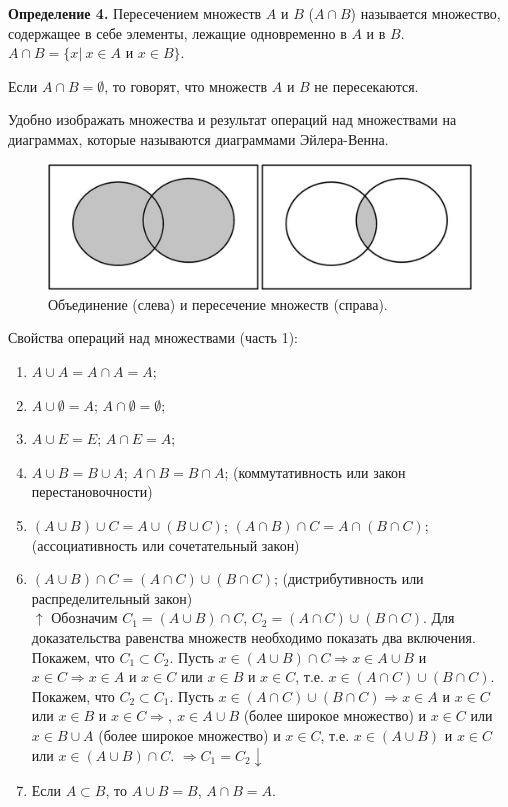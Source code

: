 \documentclass{article}
\begin{document}
    \textbf{Определение 4.} Пересечением множеств $A$ и $B$ ($A \cap B$) называется множество, содержащее в себе элементы, лежащие одновременно в $A$ и в $B$. $A \cap B = \{x|\ x \in A \textrm{ и } x \in B\}$.
    
    Если $A \cap B = \emptyset$, то говорят, что множеств $A$ и $B$ не пересекаются.  

    Удобно изображать множества и результат операций над множествами на диаграммах, которые называются диаграммами Эйлера-Венна. 

    \begin{figure}[h!]
    \centering
    \includegraphics{1_1}
    \caption{\label{fig:fig1}Объединение (слева) и пересечение множеств (справа).}
    \end{figure}

    Свойства операций над множествами (часть 1):

    \begin{enumerate}
        \item $A \cup A = A \cap A = A$;
        \item $A \cup \emptyset = A$; $A \cap \emptyset = \emptyset$;
        \item $A \cup E = E$; $A \cap E = A$;
        \item $A \cup B = B \cup A$; $A \cap B = B \cap A$; (коммутативность или закон перестановочности)
        \item $(A \cup B) \cup C = A \cup (B \cup C)$; $(A \cap B) \cap C = A \cap (B \cap C)$; (ассоциативность или сочетательный закон)
        \item $(A \cup B) \cap C = (A \cap C) \cup (B \cap C)$; (дистрибутивность или распределительный закон)\\
        $\uparrow$ Обозначим $C_1 = (A \cup B) \cap C$, $C_2 = (A \cap C) \cup (B \cap C)$. Для доказательства равенства множеств необходимо показать два включения.\\
        Покажем, что $C_1 \subset C_2$. Пусть $x \in (A \cup B) \cap C \Rightarrow x \in A \cup B$ и $x \in C \Rightarrow x \in A$ и $x \in C$ или $x \in B$ и $x \in C$, т.е. $x \in (A \cap C) \cup (B \cap C)$.\\
        Покажем, что $C_2 \subset C_1$. Пусть $x \in (A \cap C) \cup (B \cap C) \Rightarrow x \in A$ и $x \in C$ или $x \in B$ и $x \in C \Rightarrow,\ x \in A \cup B$ (более широкое множество) и $x \in C$ или $x \in B \cup A$ (более широкое множество) и $x \in C$, т.е. $x \in (A \cup B)$ и $x \in C$ или $x \in (A \cup B) \cap C$.
        $\Rightarrow C_1 = C_2 \downarrow$
        \item Если $A \subset B$, то $A \cup B = B$, $A \cap B = A$. 
    \end{enumerate}
\end{document}
